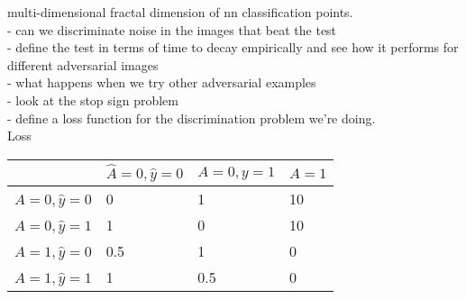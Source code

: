\documentclass[10pt]{extarticle}\usepackage[letterpaper]{geometry}
\begin{document}
  multi-dimensional fractal dimension of nn classification points.\\

  - can we discriminate noise in the images that beat the test\\
  - define the test in terms of time to decay empirically and see how
  it performs for different adversarial images\\
  - what happens when we try other adversarial examples\\
  - look at the stop sign problem\\
  - define a loss function for the discrimination problem we're
  doing.\\

  Loss\\
  \begin{tabular}{l|l|l|l}
&   $\hat A=0,\hat y=0$ & $A=0,y=1$ & $A=1$\\\hline
    $\hat A=0,\hat y=0$ & 0 & 1 & 10 \\\hline
    $\hat A=0,\hat y=1$ & 1 & 0 & 10 \\\hline
    $\hat A=1,\hat y=0$     & 0.5 & 1 & 0 \\\hline
    $\hat A=1,\hat y=1$     & 1 & 0.5 & 0 \\    
\end{tabular}               




%

\end{document}
